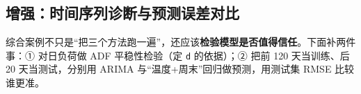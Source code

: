 \subsection{增强：时间序列诊断与预测误差对比}\label{ux589eux5f3aux65f6ux95f4ux5e8fux5217ux8bcaux65adux4e0eux9884ux6d4bux8befux5deeux5bf9ux6bd4}

综合案例不只是``把三个方法跑一遍''，还应该\textbf{检验模型是否值得信任}。下面补两件事：①
对日负荷做 ADF 平稳性检验（定 \texttt{d} 的依据）；② 把前 120
天当训练、后 20 天当测试，分别用 ARIMA
与``温度+周末''回归做预测，用测试集 RMSE 比较谁更准。

\begin{Shaded}
\begin{Highlighting}[]


\end{Highlighting}
\end{Shaded}
